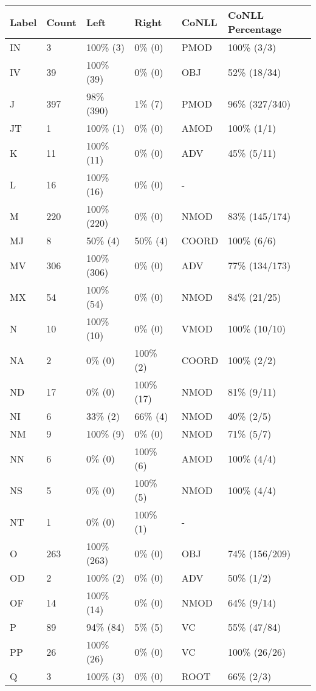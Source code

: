 \begin{figure*}
\begin{tabular}{|l|l|l|l||l|l|}
\hline
Label & Count & Left & Right & CoNLL & CoNLL Percentage\\ 
\hline
 IN & 3 & 100\% (3) & 0\% (0) & PMOD & 100\% (3/3) \\ 
\hline
 IV & 39 & 100\% (39) & 0\% (0) & OBJ & 52\% (18/34) \\ 
\hline
 J & 397 & 98\% (390) & 1\% (7) & PMOD & 96\% (327/340) \\ 
\hline
 JT & 1 & 100\% (1) & 0\% (0) & AMOD & 100\% (1/1) \\ 
\hline
 K & 11 & 100\% (11) & 0\% (0) & ADV & 45\% (5/11) \\ 
\hline
 L & 16 & 100\% (16) & 0\% (0) & - &  \\ 
\hline
 M & 220 & 100\% (220) & 0\% (0) & NMOD & 83\% (145/174) \\ 
\hline
 MJ & 8 & 50\% (4) & 50\% (4) & COORD & 100\% (6/6) \\ 
\hline
 MV & 306 & 100\% (306) & 0\% (0) & ADV & 77\% (134/173) \\ 
\hline
 MX & 54 & 100\% (54) & 0\% (0) & NMOD & 84\% (21/25) \\ 
\hline
 N & 10 & 100\% (10) & 0\% (0) & VMOD & 100\% (10/10) \\ 
\hline
 NA & 2 & 0\% (0) & 100\% (2) & COORD & 100\% (2/2) \\ 
\hline
 ND & 17 & 0\% (0) & 100\% (17) & NMOD & 81\% (9/11) \\ 
\hline
 NI & 6 & 33\% (2) & 66\% (4) & NMOD & 40\% (2/5) \\ 
\hline
 NM & 9 & 100\% (9) & 0\% (0) & NMOD & 71\% (5/7) \\ 
\hline
 NN & 6 & 0\% (0) & 100\% (6) & AMOD & 100\% (4/4) \\ 
\hline
 NS & 5 & 0\% (0) & 100\% (5) & NMOD & 100\% (4/4) \\ 
\hline
 NT & 1 & 0\% (0) & 100\% (1) & - &  \\ 
\hline
 O & 263 & 100\% (263) & 0\% (0) & OBJ & 74\% (156/209) \\ 
\hline
 OD & 2 & 100\% (2) & 0\% (0) & ADV & 50\% (1/2) \\ 
\hline
 OF & 14 & 100\% (14) & 0\% (0) & NMOD & 64\% (9/14) \\ 
\hline
 P & 89 & 94\% (84) & 5\% (5) & VC & 55\% (47/84) \\ 
\hline
 PP & 26 & 100\% (26) & 0\% (0) & VC & 100\% (26/26) \\ 
\hline
 Q & 3 & 100\% (3) & 0\% (0) & ROOT & 66\% (2/3) \\ 

\end{tabular}
\end{figure*}
